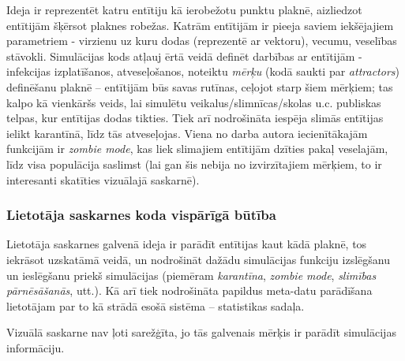 Ideja ir reprezentēt katru entītiju kā ierobežotu punktu plaknē, aizliedzot entītijām šķērsot
plaknes robežas. Katrām entītijām ir pieeja saviem iekšējajiem parametriem - virzienu
uz kuru dodas (reprezentē ar vektoru), vecumu, veselības stāvokli. Simulācijas
kods atļauj ērtā veidā definēt darbības ar entītijām - infekcijas izplatīšanos,
atveseļošanos, noteiktu \emph{mērķu} (kodā saukti par \emph{attractors}) definēšanu
plaknē -- entītijām būs savas rutīnas, ceļojot starp šiem mērķiem; tas kalpo kā
vienkāršs veids, lai simulētu veikalus/slimnīcas/skolas u.c. publiskas telpas,
kur entītijas dodas tikties. Tiek arī nodrošināta iespēja slimās entītijas
ielikt karantīnā, līdz tās atveseļojas. Viena no darba autora iecienītākajām
funkcijām ir \emph{zombie mode}, kas liek slimajiem entītijām dzīties
pakaļ veselajām, līdz visa populācija saslimst (lai gan šis nebija no izvirzītajiem
mērķiem, to ir interesanti skatīties vizuālajā saskarnē).

\subsubsection*{Lietotāja saskarnes koda vispārīgā būtība}

Lietotāja saskarnes galvenā ideja ir parādīt entītijas kaut kādā plaknē, tos
iekrāsot uzskatāmā veidā, un nodrošināt dažādu simulācijas funkciju izslēgšanu
un ieslēgšanu priekš simulācijas (piemēram \emph{karantīna}, \emph{zombie mode},
\emph{slimības pārnēsāšanās}, utt.). Kā arī tiek nodrošināta papildus meta-datu
parādīšana lietotājam par to kā strādā esošā sistēma -- statistikas sadaļa.

Vizuālā saskarne nav ļoti sarežģīta, jo tās galvenais mērķis ir parādīt simulācijas
informāciju.
